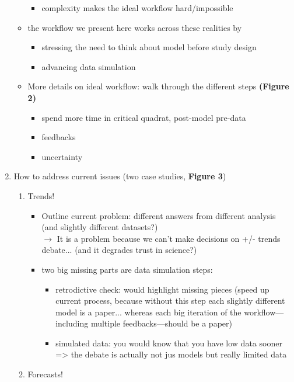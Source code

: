 \documentclass[11pt]{article}
\begin{document}
\begin{enumerate}
\begin{itemize}
\begin{itemize}
\item complexity makes the ideal workflow hard/impossible
\end{itemize}
\item the workflow we present here works across these realities by
\begin{itemize}
\item stressing the need to think about model before study design
\item advancing data simulation
\end{itemize}
\item More details on ideal workflow:  walk through the different steps \textbf{(Figure 2)}
\begin{itemize}
\item spend more time in critical quadrat, post-model pre-data
\item feedbacks
\item uncertainty
\end{itemize}
\end{itemize}
\item How to address current issues (two case studies, \textbf{Figure 3})
\begin{enumerate}
\item Trends!
\begin{itemize}
\item Outline current problem: different answers from different analysis (and slightly different datasets?)\\
$\rightarrow$ It is a problem because we can't make decisions on +/- trends debate... (and it degrades trust in science?)
\item two big missing parts are data simulation steps:
\begin{itemize}
\item retrodictive check: would highlight missing pieces (speed up current process, because without this step each slightly different model is a paper... whereas each big iteration of the workflow---including multiple feedbacks---should be a paper)
\item simulated data: you would know that you have low data sooner => the debate is actually not jus models but really limited data
\end{itemize}
\end{itemize}
\item Forecasts!
\begin{itemize}

\end{itemize}
\end{enumerate}
\end{enumerate}
\end{document}
